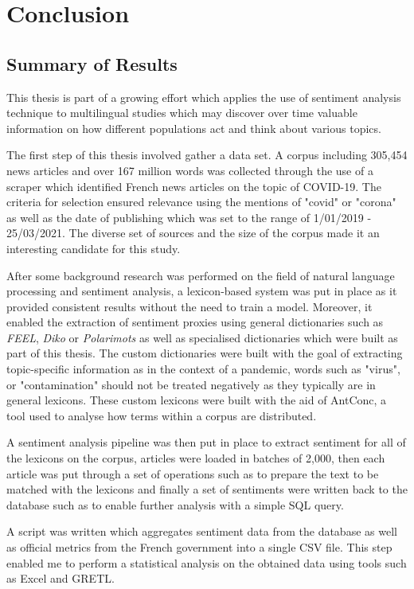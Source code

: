 \chapter{Conclusion}\label{Conclusion}

\section{Summary of Results}

This thesis is part of a growing effort which applies the use of sentiment analysis technique to multilingual studies which may discover over time valuable information on how different populations act and think about various topics.

The first step of this thesis involved gather a data set. A corpus including 305,454 news articles and over 167 million words was collected through the use of a scraper which identified French news articles on the topic of COVID-19. The criteria for selection ensured relevance using the mentions of "covid" or "corona" as well as the date of publishing which was set to the range of 1/01/2019 - 25/03/2021. The diverse set of sources and the size of the corpus made it an interesting candidate for this study.

After some background research was performed on the field of natural language processing and sentiment analysis, a lexicon-based system was put in place as it provided consistent results without the need to train a model. Moreover, it enabled the extraction of sentiment proxies using general dictionaries such as \emph{FEEL}, \emph{Diko} or \emph{Polarimots} as well as specialised dictionaries which were built as part of this thesis. The custom dictionaries were built with the goal of extracting topic-specific information as in the context of a pandemic, words such as "virus", or "contamination" should not be treated negatively as they typically are in general lexicons. These custom lexicons were built with the aid of AntConc, a tool used to analyse how terms within a corpus are distributed.

A sentiment analysis pipeline was then put in place to extract sentiment for all of the lexicons on the corpus, articles were loaded in batches of 2,000, then each article was put through a set of operations such as to prepare the text to be matched with the lexicons and finally a set of sentiments were written back to the database such as to enable further analysis with a simple SQL query. 

A script was written which aggregates sentiment data from the database as well as official metrics from the French government into a single CSV file. This step enabled me to perform a statistical analysis on the obtained data using tools such as Excel and GRETL.

